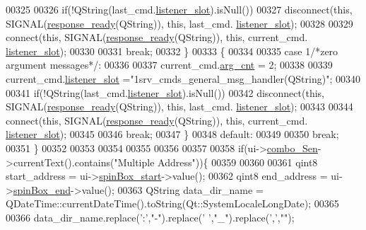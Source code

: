 \begin{DoxyCode}
00325 
00326             \textcolor{keywordflow}{if}(!QString(last\_cmd.\hyperlink{a00004_abb76d8edb39876deb60975c8fd784b3f}{listener\_slot}).isNull())
00327             disconnect(\textcolor{keyword}{this}, SIGNAL(\hyperlink{a00017_a3f6396874778799cf07a7a0149e54977}{response\_ready}(QString)), \textcolor{keyword}{this}, last\_cmd.
      \hyperlink{a00004_abb76d8edb39876deb60975c8fd784b3f}{listener\_slot});
00328 
00329             connect(\textcolor{keyword}{this}, SIGNAL(\hyperlink{a00017_a3f6396874778799cf07a7a0149e54977}{response\_ready}(QString)), \textcolor{keyword}{this}, current\_cmd.
      \hyperlink{a00004_abb76d8edb39876deb60975c8fd784b3f}{listener\_slot});
00330 
00331     \textcolor{keywordflow}{break};
00332  \}
00333  \{
00334 
00335     \textcolor{keywordflow}{case} 1\textcolor{comment}{/*zero argument messages*/}:
00336 
00337             current\_cmd.\hyperlink{a00004_affcea772a1bc5362ebbc274b6166f81b}{arg\_cnt}  = 2;
00338 
00339             current\_cmd.\hyperlink{a00004_abb76d8edb39876deb60975c8fd784b3f}{listener\_slot} =\textcolor{stringliteral}{"1srv\_cmds\_general\_msg\_handler(QString)"};
00340 
00341             \textcolor{keywordflow}{if}(!QString(last\_cmd.\hyperlink{a00004_abb76d8edb39876deb60975c8fd784b3f}{listener\_slot}).isNull())
00342             disconnect(\textcolor{keyword}{this}, SIGNAL(\hyperlink{a00017_a3f6396874778799cf07a7a0149e54977}{response\_ready}(QString)), \textcolor{keyword}{this}, last\_cmd.
      \hyperlink{a00004_abb76d8edb39876deb60975c8fd784b3f}{listener\_slot});
00343 
00344             connect(\textcolor{keyword}{this}, SIGNAL(\hyperlink{a00017_a3f6396874778799cf07a7a0149e54977}{response\_ready}(QString)), \textcolor{keyword}{this}, current\_cmd.
      \hyperlink{a00004_abb76d8edb39876deb60975c8fd784b3f}{listener\_slot});
00345 
00346     \textcolor{keywordflow}{break};
00347 \}
00348     \textcolor{keywordflow}{default}:
00349 
00350         \textcolor{keywordflow}{break};
00351     \}
00352 
00353 
00354 
00355 
00356 
00357 
00358     \textcolor{keywordflow}{if}(ui->\hyperlink{a00080_ad95005b5fcac8126171019298147b285}{combo\_Sen}->currentText().contains(\textcolor{stringliteral}{"Multiple Address"}))\{
00359 
00360 
00361           qint8 start\_address = ui->\hyperlink{a00080_acb4d6609c580645dac5aee1f1ad59d01}{spinBox\_start}->value();
00362           qint8 end\_address   = ui->\hyperlink{a00080_a8ebeb5caa10878d7806d1f548913b449}{spinBox\_end}->value();
00363           QString data\_dir\_name = QDateTime::currentDateTime().toString(Qt::SystemLocaleLongDate);
00365 
00366           data\_dir\_name.replace(\textcolor{charliteral}{':'},\textcolor{stringliteral}{"-"}).replace(\textcolor{charliteral}{' '},\textcolor{stringliteral}{"\_"}).replace(\textcolor{charliteral}{','},\textcolor{stringliteral}{""});

\end{DoxyCode}
